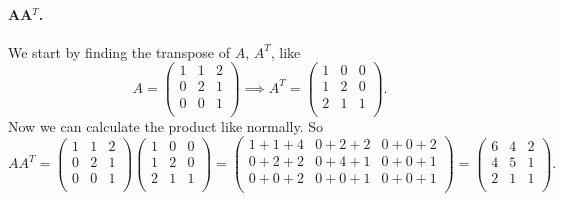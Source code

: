 \paragraph{AA$^T$.} We start by finding the transpose of $A$, $A^T$, like
\[ 
A = \begin{pmatrix}
1 & 1 & 2\\
0 & 2 & 1\\
0 & 0 & 1\\
\end{pmatrix} \implies A^T = \begin{pmatrix}
1 & 0 & 0\\
1 & 2 & 0\\
2 & 1 & 1\\
\end{pmatrix}
.\]
Now we can calculate the product like normally. So
\[ 
A A^T = \begin{pmatrix}
1 & 1 & 2\\
0 & 2 & 1\\
0 & 0 & 1\\
\end{pmatrix} \begin{pmatrix}
1 & 0 & 0\\
1 & 2 & 0\\
2 & 1 & 1\\
\end{pmatrix} = \begin{pmatrix} 1 + 1 + 4 & 0 + 2 + 2 & 0 + 0 + 2\\
0 + 2 + 2 & 0 + 4 + 1 & 0 + 0 + 1\\
0 + 0 + 2 & 0 + 0 + 1 & 0 + 0 + 1\\
\end{pmatrix} = \begin{pmatrix}
6 & 4 & 2\\
4 & 5 & 1\\
2 & 1 & 1\\
\end{pmatrix}
.\]

